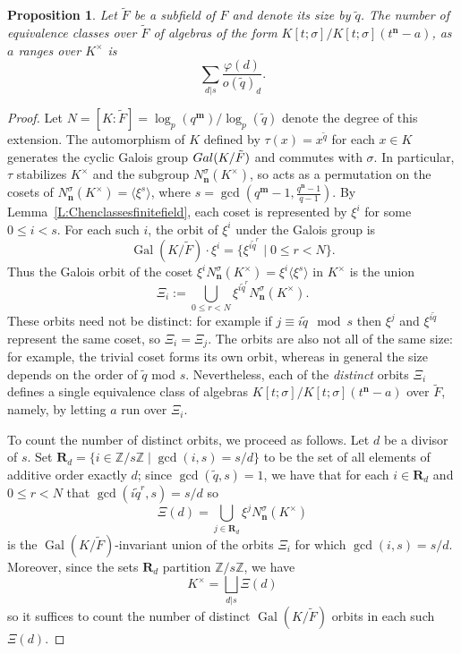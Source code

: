 \documentclass[10pt,a4paper]{amsart}
\newtheorem{proposition}{Proposition}
\DeclareMathOperator{\Gal}{Gal}
\newcommand{\Z}{\mathbb{Z}} %
\newcommand{\de}{{\mathbf{n}}}  %
\newcommand{\os}{{\mathbf{m}}}  %
\begin{document}
\begin{proposition}\label{T:F-tildeequivalencecount}
    Let $\tilde{F}$ be a subfield of $F$ and denote its size by $\tilde{q}$.  The number of equivalence classes over $\tilde{F}$ of algebras of the form $K[t;\sigma]/K[t;\sigma](t^\de-a)$, as $a$ ranges over $K^\times$ is
    $$
    \sum_{d|s}\frac{\varphi(d)}{o(\tilde{q})_d}.
    $$
\end{proposition}

\begin{proof}
    Let $N=[K:\tilde{F}]=\log_p(q^\os)/\log_p(\tilde{q})$ denote the degree of this extension.  The automorphism of $K$ defined by $\tau(x)=x^{\tilde{q}}$ for each $x\in K$ generates the cyclic  Galois group ${\rm Gal}(K/\tilde{F})$ and commutes with $\sigma$.  In particular, $\tau$ stabilizes $K^\times$ and the subgroup $N^\sigma_\de(K^\times)$, so acts as a permutation on  the cosets of $N^\sigma_\de(K^\times)=\langle \xi^s\rangle$, where $s=\gcd\left(q^\os-1, \frac{q^\de-1}{q-1}\right)$.
    By Lemma~\ref{L:Chenclassesfinitefield}, each coset is represented by $\xi^i$ for some $0\leq i <s$.  For each such $i$, the orbit of $\xi^i$ under the Galois group is
    $$
    \Gal(K/\tilde{F})\cdot \xi^i = \{ \xi^{i\tilde{q}^r} \mid 0\leq r < N\}.
    $$
    Thus the Galois orbit of the coset $\xi^i N^\sigma_\de(K^\times) = \xi^i\langle \xi^s\rangle$ in $K^\times$ is the union
    $$
    \Xi_i:=\bigcup_{0\leq r<N}\xi^{i\tilde{q}^r}N^\sigma_\de(K^\times).
    $$
    These orbits need not be distinct: for example if $j\equiv i\tilde{q}\mod s$ then $\xi^j$ and $\xi^{i\tilde{q}}$ represent the same coset, so $\Xi_i=\Xi_{j}$.  The orbits are also not all of the same size: for example, the trivial coset forms its own orbit, whereas in general the size depends on the order of $\tilde{q}$ mod $s$.  Nevertheless, each of the \emph{distinct} orbits  $\Xi_i$ defines a single equivalence class of algebras $K[t;\sigma]/K[t;\sigma](t^\de-a)$ over $\tilde{F}$, namely, by letting $a$ run over $\Xi_i$.

    To count the number of distinct orbits, we proceed as follows.  Let $d$ be a divisor of $s$.  Set ${\mathbf R}_d = \{i\in \Z/s\Z\mid \gcd(i,s)=s/d\}$ to be the set of all elements of additive order exactly $d$; since $\gcd(\tilde{q},s)=1$, we have that for each $i\in {\mathbf R}_d$ and $0\leq r<N$ that $\gcd(i\tilde{q}^r,s)=s/d$ so
    $$
    \Xi(d) = \bigcup_{j\in \mathbf{R}_d} \xi^j N^\sigma_\de(K^\times)
    $$
    is the $\Gal(K/\tilde{F})$-invariant union of the orbits $\Xi_i$ for which $\gcd(i,s)=s/d$.  Moreover, since the sets $\mathbf{R}_d$ partition $
    \Z/s\Z$, we have
    $$
    K^\times = \bigsqcup_{d|s} \Xi(d)
    $$
    so it suffices to count the number of distinct $\Gal(K/\tilde{F})$ orbits in each such $\Xi(d)$.



\end{proof}
\end{document}
